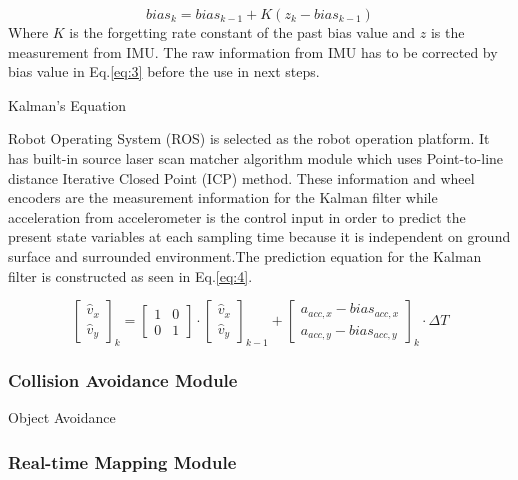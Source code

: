 \documentclass{llncs}
\newcommand{\md}[1]{\(#1\)}
\begin{document}
\begin{equation}
\label{eq:3}
bias_{k} = bias_{k-1} + K(z_{k} - bias_{k-1})
\end{equation}
Where \md{K} is the forgetting rate constant of the past bias value and \md{z} is the measurement from IMU. The raw information from IMU has to be corrected by bias value in Eq.\ref{eq:3} before the use in next steps.

Kalman's Equation

Robot Operating System (ROS) is selected as the robot operation platform. It has built-in source laser scan matcher algorithm module which uses Point-to-line distance Iterative Closed Point (ICP)\cite{icp1}\cite{icp2} method. These information and wheel encoders are the measurement information for the Kalman filter while acceleration from accelerometer is the control input in order to predict the present state variables at each sampling time because it is independent on ground surface and surrounded environment.The prediction equation for the Kalman filter is constructed as seen in Eq.\ref{eq:4}.

\begin{equation}
\label{eq:4}
\begin{bmatrix}
\hat{v}_{x} \\
\hat{v}_{y}
\end{bmatrix}_{k} = 
\begin{bmatrix}
1 & 0 \\
0 & 1 
\end{bmatrix} \cdot
\begin{bmatrix}
\hat{v}_{x} \\
\hat{v}_{y}
\end{bmatrix}_{k-1} +
\begin{bmatrix}
a_{acc,x}-bias_{acc,x} \\
a_{acc,y}-bias_{acc,y}
\end{bmatrix}_{k} \cdot \Delta T
\end{equation}

\subsubsection{Collision Avoidance Module}

Object Avoidance

\subsubsection{Real-time Mapping Module}
\end{document}
